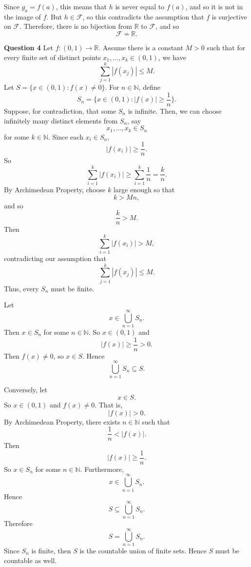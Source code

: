 \documentclass[12pt]{article}
\begin{document}
Since $g_a = f(a)$, this means that $h$ is never equal to $f(a)$, and so it is not in the image of $f$.
But $h \in \mathcal{F}$, so this contradicts the assumption that $f$ is surjective on $\mathcal{F}$.
Therefore, there is no bijection from $\mathbb{R}$ to $\mathcal{F}$, and so
\[
    \mathcal{F} \not \sim \mathbb{R}.
\]

\noindent{} \textbf{Question 4}
Let $f: (0,1) \to \mathbb{R}$.
Assume there is a constant $M >0$ such that for every finite set of distinct points
$x_1, ... , x_k \in (0, 1)$, we have
\[
    \sum_{j=1}^{k}|f(x_j)| \leq M.
\]
Let $S = \{x \in (0,1) : f(x) \neq 0\}$.
For $n \in \mathbb{N}$, define
\[
    S_n = \{ x \in (0,1): |f(x)| \geq \frac{1}{n} \}.
\]
Suppose, for contradiction, that some $S_n$ is infinite.
Then, we can choose infinitely many distinct elements from $S_n$, say
\[
    x_1, ... , x_k \in S_n
\]
for some $k \in \mathbb{N}$.
Since each $x_i \in S_n$,
\[
    |f(x_i)| \geq \frac{1}{n}.
\]
So
\[
    \sum_{i=1}^{k}|f(x_i)| \geq \sum_{i=1}^{k}\frac{1}{n} = \frac{k}{n}.
\]
By Archimedean Property, choose $k$ large enough so that
\[
    k > Mn,
\]
and so
\[
    \frac{k}{n} > M.
\]
Then
\[
    \sum_{i=1}^{k}|f(x_i)| > M,
\]
contradicting our assumption that
\[
    \sum_{j=1}^{k}|f(x_j)| \leq M.
\]
Thus, every $S_n$ must be finite.

Let
\[
    x \in \bigcup_{n=1}^{\infty} S_n.
\]
Then $x \in S_n$ for some $n \in \mathbb{N}$.
So $x \in (0, 1)$ and
\[
    |f(x)| \geq \frac{1}{n} > 0.
\]
Then $f(x) \neq 0$, so $x \in S$.
Hence
\[
    \bigcup_{n=1}^{\infty} S_n \subseteq S.
\]

Conversely, let
\[
    x \in S.
\]
So $x \in (0, 1)$ and $f(x) \neq 0$.
That is,
\[
    |f(x)| > 0.
\]
By Archimedean Property, there exists $n \in \mathbb{N}$ such that
\[
    \frac{1}{n} < |f(x)|.
\]
Then
\[
    |f(x)| \geq \frac{1}{n}.
\]
So $x \in S_n$ for some $n \in \mathbb{N}$.
Furthermore,
\[
    x \in \bigcup_{n=1}^{\infty} S_n.
\]
Hence
\[
    S \subseteq \bigcup_{n=1}^{\infty} S_n.
\]
Therefore
\[
    S = \bigcup_{n=1}^{\infty} S_n.
\]
Since $S_n$ is finite, then $S$ is the countable union of finite sets.
Hence $S$ must be countable as well.
\end{document}

